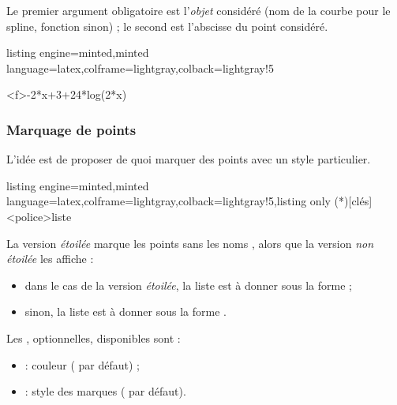 \documentclass[11pt,a4paper]{ltxdoc}
\begin{document}
Le premier argument obligatoire est l'\textit{objet} considéré (nom de la courbe pour le spline, fonction sinon) ; le second est l'abscisse du point considéré.

\begin{tcblisting}{listing engine=minted,minted language=latex,colframe=lightgray,colback=lightgray!5}
\begin{GraphiqueTikz}%
  [x=0.9cm,y=0.425cm,Xmin=4,Xmax=20,Origx=4,
  Ymin=40,Ymax=56,Ygrille=2,Ygrilles=1,Origy=40]
  \DefinirFonction[Nom=cf,Debut=5,Fin=19,Trace,Couleur=red]<f>{-2*x+3+24*log(2*x)}
\end{GraphiqueTikz}
\end{tcblisting}

\pagebreak

\subsubsection{Marquage de points}\label{markpts}

L'idée est de proposer de quoi marquer des points avec un style particulier.

\begin{tcblisting}{listing engine=minted,minted language=latex,colframe=lightgray,colback=lightgray!5,listing only}
\MarquerPts(*)[clés]<police>{liste}
\end{tcblisting}

La version \textit{étoilée} marque les points sans les \og noms \fg, alors que la version \textit{non étoilée} les affiche :

\begin{itemize}
  \item dans le cas de la version \textit{étoilée}, la liste est à donner sous la forme  ;
  \item sinon, la liste est à donner sous la forme .
\end{itemize}

\smallskip

Les \MontreCode{[clés]}, optionnelles, disponibles sont :

\smallskip

\begin{itemize}
  \item {} : couleur ( par défaut) ;
  \item {} : style des marques ( par défaut).
\end{itemize}
\end{document}

